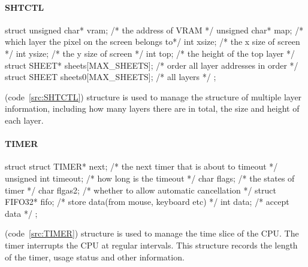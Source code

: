 \documentclass{swfcthesis}
\begin{document}
\paragraph{SHTCTL}

\begin{listing}[H]
  \begin{codeblock}
\begin{ccode}
struct 
{ 
  unsigned char* vram;              /* the address of VRAM */
  unsigned char* map;               /* which layer the pixel on the screen belongs to*/
  int xsize;                        /* the x size of screen */
  int ysize;                        /* the y size of screen */
  int top;                          /* the height of the top layer */
  struct SHEET* sheets[MAX_SHEETS]; /* order all layer addresses in order */
  struct SHEET sheets0[MAX_SHEETS]; /* all layers */
};
\end{ccode}
  \end{codeblock}
  \caption{\emph{struct SHTCTL}}\label{src:SHTCTL}
\end{listing}

(code~\ref{src:SHTCTL}) structure is used to manage the structure of multiple layer information,
including how many layers there are in total, the size and height of each layer.



\paragraph{TIMER}

\begin{listing}[H]
  \begin{codeblock}
\begin{ccode}
struct 
{ 
  struct TIMER* next;   /* the next timer that is about to timeout */
  unsigned int timeout; /* how long is the timeout */
  char flags;           /* the states of timer */
  char flgas2;          /* whether to allow automatic cancellation */
  struct FIFO32* fifo;  /* store data(from mouse, keyboard etc) */
  int data;             /* accept data */
};
\end{ccode}
  \end{codeblock}
  \caption{\emph{struct TIMER}}\label{src:TIMER}
\end{listing}

(code~\ref{src:TIMER}) structure is used to manage the time slice of the CPU. The timer
interrupts the CPU at regular intervals. This structure records the length of the timer,
usage status and other information.
\end{document}
